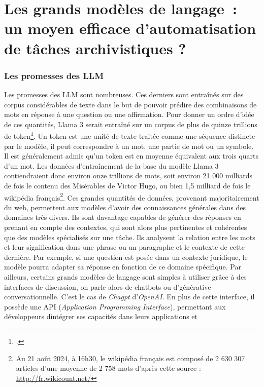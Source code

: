 \chapter{Les grands modèles de langage~: un moyen efficace	d'automatisation de tâches archivistiques ?}

	\subsection{Les promesses des \gls{LLM}}
	
	Les promesses des \gls{LLM} sont nombreuses. Ces derniers sont entraînés 
	sur des corpus considérables de texte dans le but
	de pouvoir prédire des combinaisons de mots en réponse à une question ou
	une affirmation. Pour donner un ordre d'idée de ces quantités, Llama 3
	serait entraîné sur un corpus de plus de quinze trillions de
	\gls{token}\footcite{meta}. Un token est
	une unité de texte traitée comme une séquence distincte par le modèle, il
	peut correspondre à un mot, une partie de mot ou un symbole. Il est
	généralement admis qu'un \gls{token} est en moyenne équivalent aux trois
	quarts d'un mot. Les données d'entraînement de la base du modèle Llama 3
	contiendraient donc environ onze trillions de mots, soit environ 21 000
	milliards de fois le contenu des Misérables de Victor Hugo, ou bien 1,5
	milliard de fois le wikipédia français\footnote{Au 21 août 2024, à 16h30, le wikipédia français est composé de 2 630 307 articles
		d'une moyenne de 2 758 mots d'après cette source : \url{http://fr.wikicount.net/}}. Ces grandes quantités de données,
	provenant majoritairement du web, permettent aux modèles d'avoir des
	connaissances générales dans des domaines très divers. Ils sont
	davantage capables de générer des réponses en prenant en compte des
	contextes, qui sont alors plus pertinentes
	et cohérentes que des modèles spécialisés sur une tâche. Ils analysent
	la relation entre les mots et leur signification dans une phrase ou un
	paragraphe et le contexte de cette dernière. Par exemple, si une
	question est posée dans un contexte juridique, le modèle pourra adapter
	sa réponse en fonction de ce domaine spécifique. Par ailleurs, certains
	grands modèles de langage sont simples à utiliser grâce à des interfaces
	de discussion, on parle alors de \gls{chatbot}s ou d'\gls{générative}
	conversationnelle. C'est le cas de \emph{Chagpt}
	d'\emph{OpenAI.} En plus de cette interface, il possède une API
	(\emph{Application Programming Interface}), permettant aux développeurs
	d\textquotesingle intégrer ses capacités dans leurs applications et
